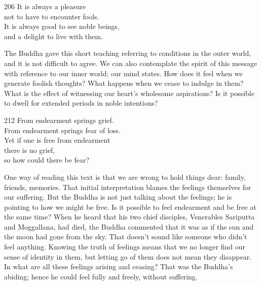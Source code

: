
\begin{dhpVerse}{206}
\label{dhp-206}
It is always a pleasure\\
not to have to encounter fools.\\
It is always good to see noble beings,\\
and a delight to live with them.
\end{dhpVerse}

\begin{dhpRefl}
  The Buddha gave this short teaching referring to conditions in the outer
  world, and it is not difficult to agree. We can also contemplate the spirit of
  this message with reference to our inner world; our mind states. How does it
  feel when we generate foolish thoughts? What happens when we cease to indulge
  in them? What is the effect of witnessing our heart’s wholesome aspirations?
  Is it possible to dwell for extended periods in noble intentions?
\end{dhpRefl}


\begin{dhpVerse}{212}
\label{dhp-212}
From endearment springs grief.\\
From endearment springs fear of loss.\\
Yet if one is free from endearment\\
there is no grief,\\
so how could there be fear?
\end{dhpVerse}

\begin{dhpRefl}
  One way of reading this text is that we are wrong to hold things dear: family,
  friends, memories. That initial interpretation blames the feelings themselves
  for our suffering. But the Buddha is not just talking about the feelings; he
  is pointing to how we might be free. Is it possible to feel endearment and be
  free at the same time? When he heard that his two chief disciples, Venerables
  Sariputta and Moggallana, had died, the Buddha commented that it was as if the
  sun and the moon had gone from the sky. That doesn’t sound like someone who
  didn't feel anything. Knowing the truth of feelings means that we no longer
  find our sense of identity in them, but letting go of them does not mean they
  disappear. In what are all these feelings arising and ceasing? That was the
  Buddha’s abiding; hence he could feel fully and freely, without suffering.
\end{dhpRefl}

